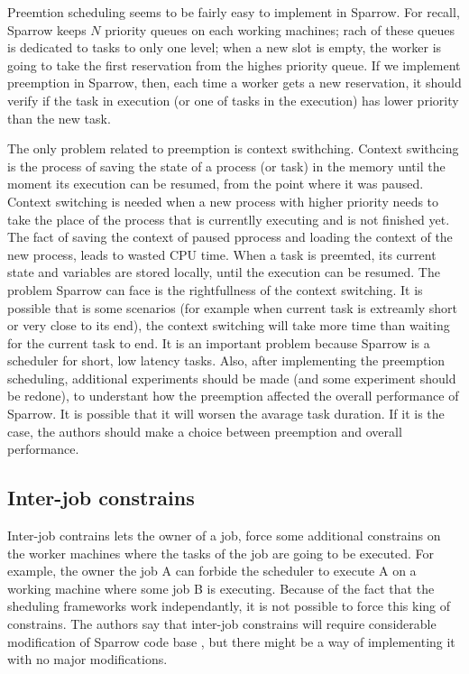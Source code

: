 \documentclass[11pt]{article}
\begin{document}
		Preemtion scheduling seems to be fairly easy to implement in Sparrow. For recall, Sparrow keeps $N$ priority queues on each working machines; rach of these queues is dedicated to tasks to only one level; when a new slot is empty, the worker is going to take the first reservation from the highes priority queue. If we implement preemption in Sparrow, then, each time a worker gets a new reservation, it should verify if the task in execution (or one of tasks in the execution) has lower priority than the new task.
		
		The only problem related to preemption is context swithching. Context swithcing is the process of saving the state of a process (or task) in the memory until the moment its execution can be resumed, from the point where it was paused. Context switching is needed when a new process with higher priority needs to take the place of the process that is currentlly executing and is not finished yet. The fact of saving the context of paused pprocess and loading the context of the new process, leads to wasted CPU time. When a task is preemted, its current state and variables are stored locally, until the execution can be resumed. The problem Sparrow can face is the rightfullness of the context switching. It is possible that is some scenarios (for example when current task is extreamly short or very close to its end), the context switching will take more time than waiting for the current task to end. It is an important problem because Sparrow is a scheduler for short, low latency tasks. Also, after implementing the preemption scheduling, additional experiments should be made (and some experiment should be redone), to understant how the preemption affected the overall performance of Sparrow. It is possible that it will worsen the avarage task duration. If it is the case, the authors should make a choice between preemption and overall performance.
		
		
	\subsection{Inter-job constrains}
	
		Inter-job contrains lets the owner of a job, force some additional constrains on the worker machines where the tasks of the job are going to be executed. For example, the owner the job A can forbide the scheduler to execute A on a working machine where some job B is executing. Because of the fact that the sheduling frameworks work independantly, it is not possible to force this king of constrains. The authors say that inter-job constrains will require considerable modification of Sparrow code base \cite[section 8]{sparrow}, but there might be a way of implementing it with no major modifications.
		
\end{document}
